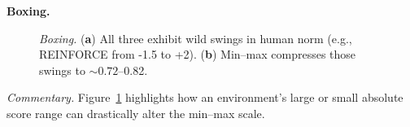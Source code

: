 \noindent \textbf{Boxing.}
\begin{figure} 
	\centering
	\quad
	\caption{\emph{Boxing.}
		(\textbf{a}) All three exhibit wild swings in human norm (e.g., REINFORCE from -1.5 to +2).
		(\textbf{b}) Min--max compresses those swings to \(\sim0.72\)--0.82.}
	\label{fig:boxing_combined}
\end{figure}

\noindent
\emph{Commentary.} Figure~\ref{fig:boxing_combined} highlights how an environment’s large or small absolute score range can drastically alter the min--max scale.

\medskip

